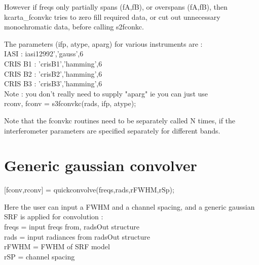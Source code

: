 \documentclass[12pt]{article}
\begin{document}
However if freqs only partially spans (fA,fB), or overspans (fA,fB), then
kcarta\_fconvkc tries to zero fill required data, or cut out unnecessary 
monochromatic data, before calling s2fconkc.

The parameters (ifp, atype, aparg) for various instruments are : \\
IASI : iasi12992','gauss',6 \\
CRIS B1 : 'crisB1','hamming',6\\
CRIS B2 : 'crisB2','hamming',6\\
CRIS B3 : 'crisB3','hamming',6\\
Note : you don't really need to supply "aparg" ie you can just use \\
  rconv, fconv = s3fconvkc(rads, ifp, atype);

Note that the fconvkc routines need to be separately called N times, if the
interferometer parameters are specified separately for different bands.

\section{Generic gaussian convolver}
  [fconv,rconv] = quickconvolve(freqs,rads,rFWHM,rSp); 

Here the user can input a FWHM and a channel spacing, and a generic gaussian
SRF is applied for convolution : \\
freqs = input freqs from, radsOut structure\\
rads  = input radiances from radsOut structure\\
rFWHM = FWHM of SRF model\\
rSP = channel spacing\\
\end{document}
